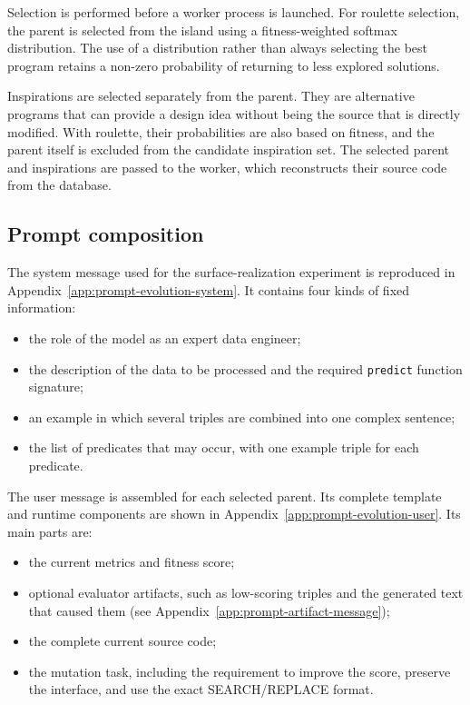 Selection is performed before a worker process is launched. For roulette
selection, the parent is selected from the island using a
fitness-weighted softmax distribution. The use of a distribution
rather than always selecting the best program retains a non-zero probability
of returning to less explored solutions.

Inspirations are selected separately from the parent. They are alternative
programs that can provide a design idea without being the source that is
directly modified. With roulette, their probabilities are
also based on fitness, and the parent itself is excluded from the candidate
inspiration set. The selected parent and inspirations are
passed to the worker, which reconstructs their source code from the database.

\subsection{Prompt composition}

The system message used for the surface-realization experiment is reproduced in
Appendix~\ref{app:prompt-evolution-system}. It contains four kinds of fixed
information:

\begin{itemize}
  \item the role of the model as an expert data engineer;
  \item the description of the data to be processed and the required \texttt{predict} function signature;
  \item an example in which several triples are combined into one complex
  sentence;
  \item the list of predicates that may occur, with one example triple for
  each predicate.
\end{itemize}

The user message is assembled for each selected parent. Its complete template
and runtime components are shown in Appendix~\ref{app:prompt-evolution-user}.
Its main parts are:

\begin{itemize}
  \item the current metrics and fitness score;
  \item optional evaluator artifacts, such as low-scoring triples and the
  generated text that caused them (see Appendix~\ref{app:prompt-artifact-message});
  \item the complete current source code;
  \item the mutation task, including the requirement to improve
  the score, preserve the interface, and use the exact
  SEARCH/REPLACE format.
\end{itemize}


